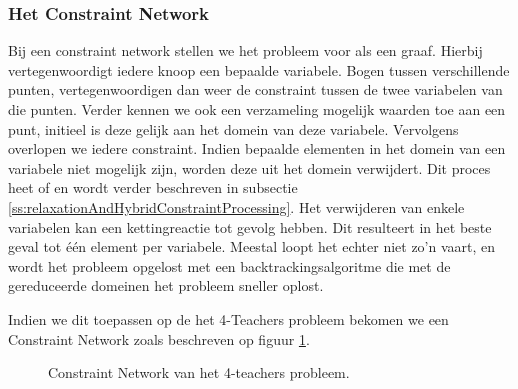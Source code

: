 \subsubsection{Het Constraint Network}
Bij een constraint network stellen we het probleem voor als een graaf. Hierbij vertegenwoordigt iedere knoop een bepaalde variabele. Bogen tussen verschillende punten, vertegenwoordigen dan weer de constraint tussen de twee variabelen van die punten. Verder kennen we ook een verzameling mogelijk waarden toe aan een punt, initieel is deze gelijk aan het domein van deze variabele. Vervolgens overlopen we iedere constraint. Indien bepaalde elementen in het domein van een variabele niet mogelijk zijn, worden deze uit het domein verwijdert. Dit proces heet  of  en wordt verder beschreven in subsectie \ref{ss:relaxationAndHybridConstraintProcessing}. Het verwijderen van enkele variabelen kan een kettingreactie tot gevolg hebben. Dit resulteert in het beste geval tot één element per variabele. Meestal loopt het echter niet zo'n vaart, en wordt het probleem opgelost met een backtrackingsalgoritme die met de gereduceerde domeinen het probleem sneller oplost.
\begin{leftbar}
Indien we dit toepassen op de het 4-Teachers probleem bekomen we een Constraint Network zoals beschreven op figuur \ref{fig:fourTeachersConstraintNetwork}.
\end{leftbar}
\begin{figure}[htb]
\centering
{}
\caption{Constraint Network van het 4-teachers probleem.}
\label{fig:fourTeachersConstraintNetwork}
\end{figure}
